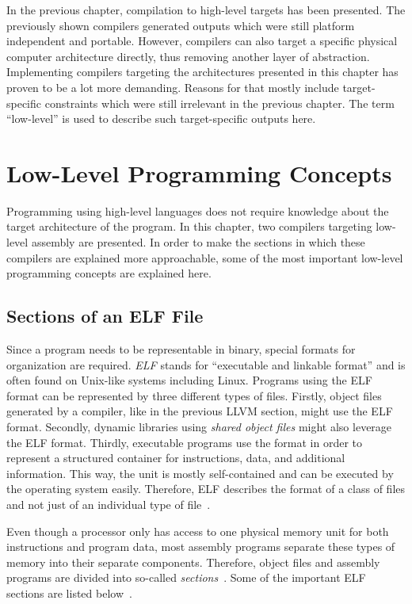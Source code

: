 In the previous chapter, compilation to high-level targets has been presented.
The previously shown compilers generated outputs which were still platform independent and portable.
However, compilers can also target a specific physical computer architecture directly, thus removing another layer of abstraction.
Implementing compilers targeting the architectures presented in this chapter has proven to be a lot more demanding.
Reasons for that mostly include target-specific constraints which were
still irrelevant in the previous chapter.
The term \enquote{low-level} is used to describe such target-specific outputs here.

\section{Low-Level Programming Concepts}
Programming using high-level languages does not require knowledge about the target architecture of the program.
In this chapter, two compilers targeting low-level assembly are presented.
In order to make the sections in which these compilers are explained more approachable,
some of the most important low-level programming concepts are explained here.

\subsection{Sections of an ELF File}
Since a program needs to be representable in binary, special formats for organization are required.
\emph{ELF} stands for \enquote{executable and linkable format} and is often found on \mbox{Unix-like} systems including Linux.
Programs using the ELF format can be represented by three different types of files.
Firstly, object files generated by a compiler, like in the previous LLVM section, might use the ELF format.
Secondly, dynamic libraries using \emph{shared object files} might also leverage the ELF format.
Thirdly, executable programs use the format in order to represent a structured container for instructions, data, and additional information.
This way, the unit is mostly self-contained and can be executed by the operating system easily.
Therefore, ELF describes the format of a class of files and not just of an individual type of file~\cite[pp.~74--76]{Zhirkov2017-wk}.

Even though a processor only has access to one physical memory unit for both instructions and program data,
most assembly programs separate these types of memory into their separate components.
Therefore, object files and assembly programs are divided into so-called \emph{sections}~\cite[p.~19]{Zhirkov2017-wk}.
Some of the important ELF sections are listed below~\cite[p.~76]{Zhirkov2017-wk}.

